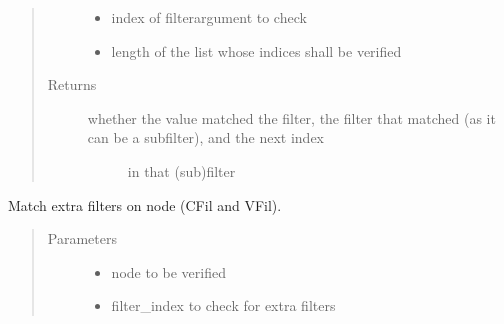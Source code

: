 \documentclass[a4paper,10pt,english]{sphinxmanual}
\begin{document}
\begin{fulllineitems}
\begin{fulllineitems}
\begin{quote}
\begin{description}
\begin{itemize}
\item {}
\sphinxAtStartPar
{} \textendash{} index of filter\sphinxhyphen{}argument to check

\item {}
\sphinxAtStartPar
{} \textendash{} length of the list whose indices shall be verified

\end{itemize}

\item[{Returns}] \leavevmode
\sphinxAtStartPar
\begin{description}
\item[{whether the value matched the filter, the filter that matched (as it can be a subfilter), and the next index}] \leavevmode
\sphinxAtStartPar
in that (sub)filter

\end{description}


\end{description}\end{quote}

\end{fulllineitems}


\begin{fulllineitems}
\label{\detokenize{fagus.filters:fagus.filters.KFil.match_extra_filters}}
\pysigstartsignatures
{}
\pysigstopsignatures
\sphinxAtStartPar
Match extra filters on node (CFil and VFil).
\begin{quote}\begin{description}
\item[{Parameters}] \leavevmode\begin{itemize}
\item {}
\sphinxAtStartPar
{} \textendash{} node to be verified

\item {}
\sphinxAtStartPar
{} \textendash{} filter\_index to check for extra filters


\end{itemize}
\end{description}
\end{quote}
\end{fulllineitems}
\end{fulllineitems}
\end{document}
